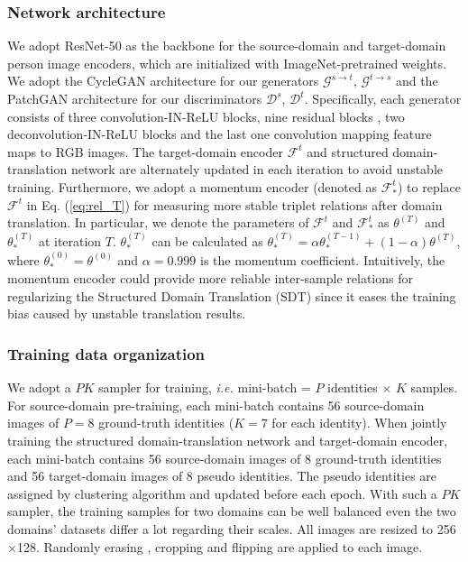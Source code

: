 \documentclass[journal]{IEEEtran}
\begin{document}
\subsubsection{\textbf{Network architecture}}
We adopt ResNet-50 \cite{he2016deep} as the backbone for the source-domain and target-domain person image encoders, which are initialized with ImageNet-pretrained \cite{deng2009imagenet} weights.
 {We adopt the CycleGAN \cite{zhu2017unpaired} architecture for our generators $\mathcal{G}^{s\to t}$, $\mathcal{G}^{t\to s}$ and the PatchGAN \cite{isola2017image} architecture for our discriminators $\mathcal{D}^s$, $\mathcal{D}^t$. Specifically, each generator consists of three convolution-IN-ReLU blocks, nine residual blocks \cite{he2016deep},  two deconvolution-IN-ReLU blocks and the last one convolution mapping feature maps to RGB images.}
The target-domain encoder $\mathcal{F}^t$ and structured domain-translation network are alternately updated in each iteration to avoid unstable training.
Furthermore, we adopt a momentum encoder \cite{he2019momentum} (denoted as $\mathcal{F}^t_*$)
to replace $\mathcal{F}^t$ in Eq. (\ref{eq:rel_T}) for measuring more stable triplet relations after domain translation.
In particular,
we denote the parameters of $\mathcal{F}^t$ and $\mathcal{F}^t_*$ as $\theta^{(T)}$ and $\theta_*^{(T)}$ at iteration $T$.
$\theta_*^{(T)}$ can be calculated as $\theta_*^{(T)}=\alpha\theta_*^{(T-1)}+(1-\alpha)\theta^{(T)}$, where $\theta_*^{(0)}=\theta^{(0)}$ and $\alpha=0.999$ is the momentum coefficient.
Intuitively, the momentum encoder could provide more reliable inter-sample relations for regularizing the Structured Domain Translation (SDT) since it eases the training bias caused by unstable translation results.


\subsubsection{\textbf{Training data organization}}
 {We adopt a $PK$ sampler for training, \textit{i.e.} mini-batch = $P$ identities $\times$ $K$ samples. For source-domain pre-training, each mini-batch contains 56 source-domain images of $P = 8$ ground-truth identities ($K = 7$ for each identity). When jointly training the structured domain-translation network and target-domain encoder,}
each mini-batch contains 56 source-domain images of 8 ground-truth identities and 56 target-domain images of 8 pseudo identities.
The pseudo identities are assigned by clustering algorithm and updated before each epoch.
 {With such a $PK$ sampler, the training samples for two domains can be well balanced even the two domains' datasets differ a lot regarding their scales.}
All images are resized to 256$\times$128.
Randomly erasing \cite{zhong2017random}, cropping and flipping are applied to each image.
\end{document}
